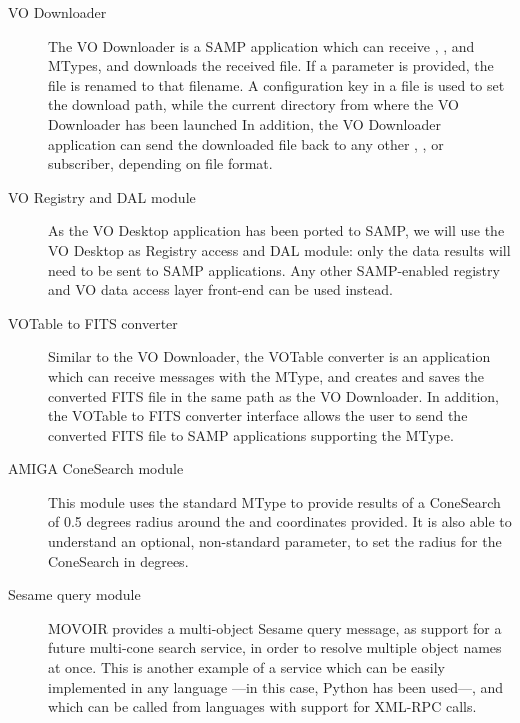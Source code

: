 		\begin{description}
			\item[VO Downloader] The VO Downloader is a SAMP
			application which can receive
			, ,
			and  MTypes, and downloads the
			received file. If a  parameter is
			provided, the file is renamed to that filename. A
			 configuration
			key in a  file is used to set the
			download path, while the current directory from where
			the VO Downloader has been launched In addition, the VO
			Downloader application can send the downloaded file
			back to any other ,
			, or 
			subscriber, depending on file format.
			
			\item[VO Registry and DAL module] As the VO Desktop
			application has been ported to SAMP, we will use the
			VO Desktop as Registry access and DAL module: only
			the data results will need to be sent to SAMP
			applications. Any other SAMP-enabled registry and
			VO data access layer front-end can be used instead.
			
			\item[VOTable to FITS converter] Similar to the VO
			Downloader, the VOTable converter is an application
			which can receive messages with the
			 MType, and creates and
			saves the converted FITS file in the same path as the
			VO Downloader. In addition, the VOTable to FITS
			converter interface allows the user to send the
			converted FITS file to SAMP applications supporting the
			 MType.
			
			\item[AMIGA ConeSearch module] This module uses the
			standard  M\-Type
			to provide results
			of a ConeSearch of 0.5 degrees radius around the
			 and  coordinates provided.
			It is also able to understand an optional,
			non-standard  parameter, to set the
			radius for the ConeSearch in degrees.
			
			\item[Sesame query module] MOVOIR provides a
			multi-object Sesame query message, as support for
			a future multi-cone search service, in order to
			resolve multiple object names at once. This is
			another example of a service which can be easily
			implemented in any language ---in this case,
			Python has been used---, and which can be called from
			languages with support for XML-RPC calls.
		\end{description}
		
